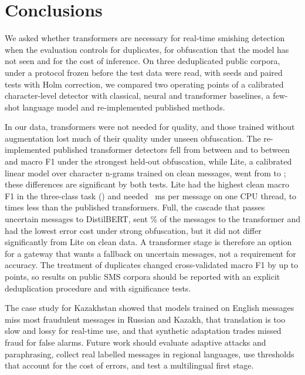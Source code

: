 \section{Conclusions}\label{sec:conclusions}

We asked whether transformers are necessary for real-time smishing detection when the evaluation controls for duplicates, for obfuscation that the model has not seen and for the cost of inference. On three deduplicated public corpora, under a protocol frozen before the test data were read, with  seeds and paired tests with Holm correction, we compared two operating points of a calibrated character-level detector with classical, neural and transformer baselines, a few-shot language model and re-implemented published methods.

In our data, transformers were not needed for quality, and those trained without augmentation lost much of their quality under unseen obfuscation. The re-implemented published transformer detectors fell from between  and  to between  and  macro F1 under the strongest held-out obfuscation, while Lite, a calibrated linear model over character n-grams trained on clean messages, went from  to ; these differences are significant by both tests. Lite had the highest clean macro F1 in the three-class task () and needed ~ms per message on one CPU thread,  to  times less than the published transformers. Full, the cascade that passes uncertain messages to DistilBERT, sent \% of the messages to the transformer and had the lowest error cost under strong obfuscation, but it did not differ significantly from Lite on clean data. A transformer stage is therefore an option for a gateway that wants a fallback on uncertain messages, not a requirement for accuracy. The treatment of duplicates changed cross-validated macro F1 by up to  points, so results on public SMS corpora should be reported with an explicit deduplication procedure and with significance tests.

The case study for Kazakhstan showed that models trained on English messages miss most fraudulent messages in Russian and Kazakh, that translation is too slow and lossy for real-time use, and that synthetic adaptation trades missed fraud for false alarms. Future work should evaluate adaptive attacks and paraphrasing, collect real labelled messages in regional languages, use thresholds that account for the cost of errors, and test a multilingual first stage.
